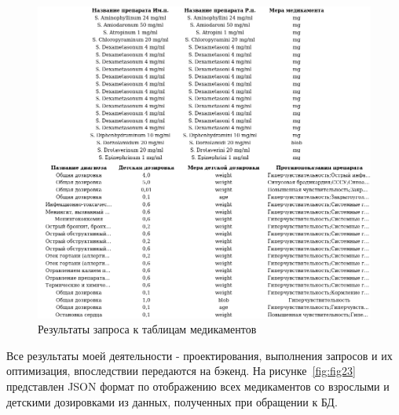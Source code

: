 \begin{figure}
  \includegraphics[scale=0.955]{inc/sh_all_ch_med1}
  \caption{Результаты запроса к таблицам медикаментов}
  \label{fig:fig22}
\end{figure}

Все результаты моей деятельности - проектирования, выполнения запросов и их оптимизация, впоследствии передаются на бэкенд. На рисунке~\ref{fig:fig23} представлен JSON формат по отображению всех медикаментов со взрослыми и детскими дозировками из данных, полученных при обращении к БД.

